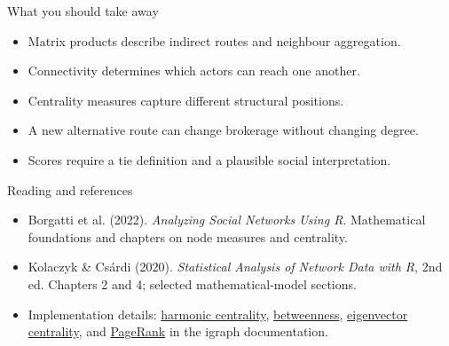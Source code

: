 \documentclass[aspectratio=169,11pt]{beamer}
\begin{document}
\begin{frame}{What you should take away}

\begin{itemize}
\item Matrix products describe indirect routes and neighbour aggregation.
\medskip\item Connectivity determines which actors can reach one another.
\medskip\item Centrality measures capture different structural positions.
\medskip\item A new alternative route can change brokerage without changing degree.
\medskip\item Scores require a tie definition and a plausible social interpretation.
\end{itemize}


\end{frame}

\begin{frame}{Reading and references}

\small
\begin{itemize}
\item Borgatti et al. (2022). \emph{Analyzing Social Networks Using R}. Mathematical foundations and chapters on node measures and centrality.
\medskip\item Kolaczyk \& Cs\'{a}rdi (2020). \emph{Statistical Analysis of Network Data with R}, 2nd ed. Chapters 2 and 4; selected mathematical-model sections.
\medskip\item Implementation details: \href{https://r.igraph.org/reference/harmonic_centrality.html}{harmonic centrality}, \href{https://r.igraph.org/reference/betweenness.html}{betweenness}, \href{https://r.igraph.org/reference/eigen_centrality.html}{eigenvector centrality}, and \href{https://r.igraph.org/reference/page_rank.html}{PageRank} in the igraph documentation.
\end{itemize}


\end{frame}
\end{document}
